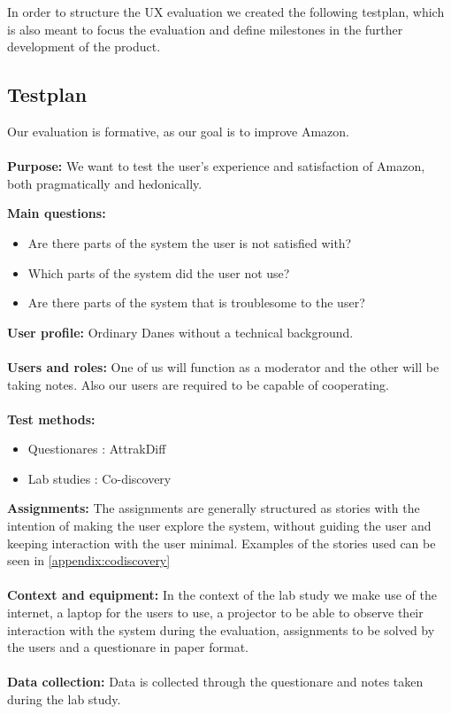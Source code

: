 In order to structure the UX evaluation we created the following testplan, which is also meant to focus the evaluation and define milestones in the further development of the product.

\subsection{Testplan}
Our evaluation is formative, as our goal is to improve Amazon. \\ \\
\textbf{Purpose:} We want to test the user's experience and satisfaction of Amazon, both pragmatically and hedonically.

\newpage
\textbf{Main questions:}
\begin{itemize}
\item Are there parts of the system the user is not satisfied with?
\item Which parts of the system did the user not use?
\item Are there parts of the system that is troublesome to the user?
\end{itemize}
\textbf{User profile:}
Ordinary Danes without a technical background. \\ \\
\textbf{Users and roles:}
One of us will function as a moderator and the other will be taking notes. Also our users are required to be capable of cooperating. \\ \\
\textbf{Test methods:}
\begin{itemize}
\item Questionares : AttrakDiff
\item Lab studies : Co-discovery
\end{itemize}
\textbf{Assignments:} The assignments are generally structured as stories with the intention of making the user explore the system, without guiding the user and keeping interaction with the user minimal. Examples of the stories used can be seen in \autoref{appendix:codiscovery} \\ \\
\textbf{Context and equipment:} In the context of the lab study we make use of the internet, a laptop for the users to use, a projector to be able to observe their interaction with the system during the evaluation, assignments to be solved by the users and a questionare in paper format. \\ \\
\textbf{Data collection:} Data is collected through the questionare and notes taken during the lab study. \\

